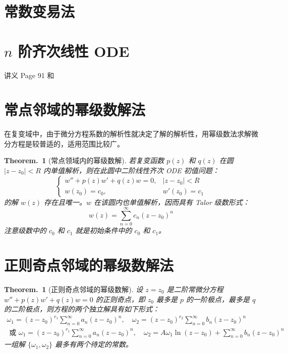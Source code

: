 \documentclass[UTF8]{report}
\theoremstyle{MyLineTheoremStyle} %
\theoremstyle{MyBlockTheoremStyle} %
\newtheorem{BlockTheorem}[LineTheorem]{Theorem.\,} %
\theoremstyle{MySubsubsectionStyle} %
\begin{document}
\section{常数变易法}

\section{$n$ 阶齐次线性 ODE}
讲义 Page 91 和 

\section{常点邻域的幂级数解法}
在复变域中，由于微分方程系数的解析性就决定了解的解析性，用幂级数法求解微分方程是较普适的，适用范围比较广。

\begin{BlockTheorem}[常点领域内的幂级数解]\label{常点领域内的幂级数解}
若复变函数 $p(z)$ 和 $q(z)$ 在圆 $| z - z_0 | < R$ 内单值解析，则在此圆中二阶线性齐次 ODE 初值问题：
\begin{equation}
\begin{cases}
    w'' + p(z)w' + q(z)w = 0, & | z - z_0 | < R \\
    w(z_0) = c_0, & w'(z_0) = c_1
\end{cases}
\end{equation}
的解 $w(z)$ 存在且唯一。$w$ 在该圆内也单值解析，因而具有 Talor 级数形式：
\begin{equation}
w(z) = \sum_{n=0}^{\infty} c_n (z - z_0)^n
\end{equation}
注意级数中的 $c_0$ 和 $c_1$ 就是初始条件中的 $c_0$ 和 $c_1$。
\end{BlockTheorem}



\section{正则奇点邻域的幂级数解法}

\begin{BlockTheorem}[正则奇点邻域的幂级数解]\label{正则奇点邻域的幂级数解}
设 $z = z_0$ 是二阶常微分方程 $w'' + p(z)w' + q(z)w = 0$ 的正则奇点，即 $z_0$ 最多是 $p$ 的一阶极点，最多是 $q$ 的二阶极点，则方程的两个独立解具有如下形式：
\begin{gather}
\omega_1 = (z - z_0)^{r_1} \sum_{n=0}^{\infty} a_n (z - z_0)^n ,\quad \omega_2 = (z - z_0)^{r_2} \sum_{n=0}^{\infty} b_n (z - z_0)^n \\ 
\text{\ 或 \ }
\omega_1 = (z - z_0)^{r_1} \sum_{n=0}^{\infty} a_n (z - z_0)^n ,\quad \omega_2 = A \omega_1 \ln (z - z_0) + \sum_{n=0}^{\infty} b_n (z - z_0)^n
\end{gather}
一组解 $\{\omega_1, \omega_2\}$ 最多有两个待定的常数。
\end{BlockTheorem}
\end{document}

